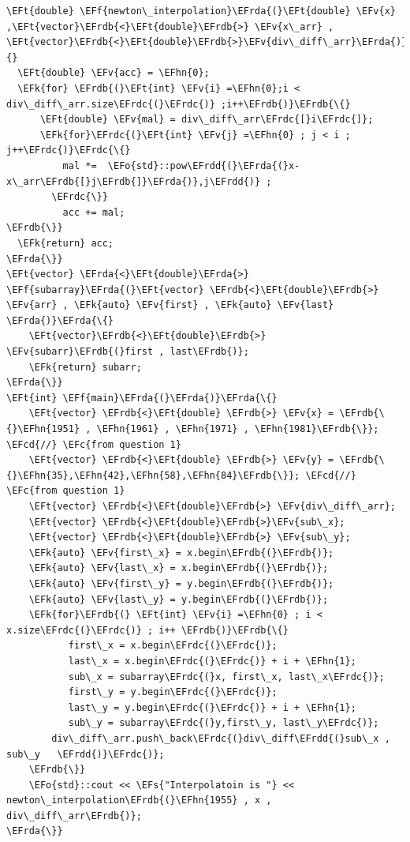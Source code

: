 \documentclass[11pt]{article}
\newcommand{\EFc}[1]{\textcolor{EFc}{#1}} %
\newcommand{\EFcd}[1]{\textcolor{EFcd}{#1}} %
\newcommand{\EFs}[1]{\textcolor{EFs}{#1}} %
\newcommand{\EFk}[1]{\textcolor{EFk}{#1}} %
\newcommand{\EFf}[1]{\textcolor{EFf}{#1}} %
\newcommand{\EFv}[1]{\textcolor{EFv}{#1}} %
\newcommand{\EFt}[1]{\textcolor{EFt}{#1}} %
\newcommand{\EFo}[1]{\textcolor{EFo}{#1}} %
\newcommand{\EFhn}[1]{\textcolor{EFhn}{#1}} %
\newcommand{\EFrda}[1]{\textcolor{EFrda}{#1}} %
\newcommand{\EFrdb}[1]{\textcolor{EFrdb}{#1}} %
\newcommand{\EFrdc}[1]{\textcolor{EFrdc}{#1}} %
\newcommand{\EFrdd}[1]{\textcolor{EFrdd}{#1}} %
\begin{document}
\begin{Code}
\begin{Verbatim}
\EFt{double} \EFf{newton\_interpolation}\EFrda{(}\EFt{double} \EFv{x} ,\EFt{vector}\EFrdb{<}\EFt{double}\EFrdb{>} \EFv{x\_arr} , \EFt{vector}\EFrdb{<}\EFt{double}\EFrdb{>}\EFv{div\_diff\_arr}\EFrda{)}\EFrda{\{}
  \EFt{double} \EFv{acc} = \EFhn{0};
  \EFk{for} \EFrdb{(}\EFt{int} \EFv{i} =\EFhn{0};i < div\_diff\_arr.size\EFrdc{(}\EFrdc{)} ;i++\EFrdb{)}\EFrdb{\{}
      \EFt{double} \EFv{mal} = div\_diff\_arr\EFrdc{[}i\EFrdc{]};
      \EFk{for}\EFrdc{(}\EFt{int} \EFv{j} =\EFhn{0} ; j < i ; j++\EFrdc{)}\EFrdc{\{}
          mal *=  \EFo{std}::pow\EFrdd{(}\EFrda{(}x-x\_arr\EFrdb{[}j\EFrdb{]}\EFrda{)},j\EFrdd{)} ;
        \EFrdc{\}}
          acc += mal;
\EFrdb{\}}
  \EFk{return} acc;
\EFrda{\}}
\EFt{vector} \EFrda{<}\EFt{double}\EFrda{>} \EFf{subarray}\EFrda{(}\EFt{vector} \EFrdb{<}\EFt{double}\EFrdb{>} \EFv{arr} , \EFk{auto} \EFv{first} , \EFk{auto} \EFv{last} \EFrda{)}\EFrda{\{}
    \EFt{vector}\EFrdb{<}\EFt{double}\EFrdb{>} \EFv{subarr}\EFrdb{(}first , last\EFrdb{)};
    \EFk{return} subarr;
\EFrda{\}}
\EFt{int} \EFf{main}\EFrda{(}\EFrda{)}\EFrda{\{}
    \EFt{vector} \EFrdb{<}\EFt{double} \EFrdb{>} \EFv{x} = \EFrdb{\{}\EFhn{1951} , \EFhn{1961} , \EFhn{1971} , \EFhn{1981}\EFrdb{\}}; \EFcd{//} \EFc{from question 1}
    \EFt{vector} \EFrdb{<}\EFt{double} \EFrdb{>} \EFv{y} = \EFrdb{\{}\EFhn{35},\EFhn{42},\EFhn{58},\EFhn{84}\EFrdb{\}}; \EFcd{//} \EFc{from question 1}
    \EFt{vector} \EFrdb{<}\EFt{double}\EFrdb{>} \EFv{div\_diff\_arr};
    \EFt{vector} \EFrdb{<}\EFt{double}\EFrdb{>}\EFv{sub\_x};
    \EFt{vector} \EFrdb{<}\EFt{double}\EFrdb{>} \EFv{sub\_y};
    \EFk{auto} \EFv{first\_x} = x.begin\EFrdb{(}\EFrdb{)};
    \EFk{auto} \EFv{last\_x} = x.begin\EFrdb{(}\EFrdb{)};
    \EFk{auto} \EFv{first\_y} = y.begin\EFrdb{(}\EFrdb{)};
    \EFk{auto} \EFv{last\_y} = y.begin\EFrdb{(}\EFrdb{)};
    \EFk{for}\EFrdb{(} \EFt{int} \EFv{i} =\EFhn{0} ; i < x.size\EFrdc{(}\EFrdc{)} ; i++ \EFrdb{)}\EFrdb{\{}
           first\_x = x.begin\EFrdc{(}\EFrdc{)};
           last\_x = x.begin\EFrdc{(}\EFrdc{)} + i + \EFhn{1};
           sub\_x = subarray\EFrdc{(}x, first\_x, last\_x\EFrdc{)};
           first\_y = y.begin\EFrdc{(}\EFrdc{)};
           last\_y = y.begin\EFrdc{(}\EFrdc{)} + i + \EFhn{1};
           sub\_y = subarray\EFrdc{(}y,first\_y, last\_y\EFrdc{)};
        div\_diff\_arr.push\_back\EFrdc{(}div\_diff\EFrdd{(}sub\_x , sub\_y   \EFrdd{)}\EFrdc{)};
    \EFrdb{\}}
    \EFo{std}::cout << \EFs{"Interpolatoin is "} << newton\_interpolation\EFrdb{(}\EFhn{1955} , x , div\_diff\_arr\EFrdb{)};
\EFrda{\}}


\end{Verbatim}
\end{Code}
\end{document}
